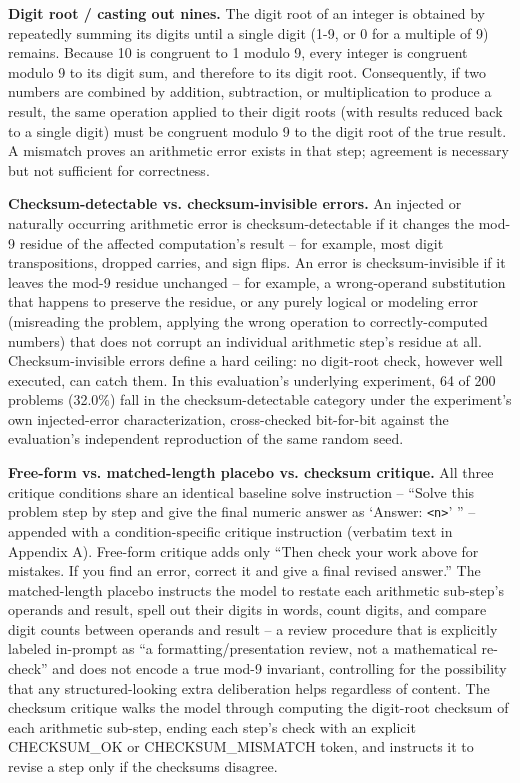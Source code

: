 \documentclass[11pt,letterpaper]{article}
\begin{document}
\textbf{Digit root / casting out nines.} The digit root of an integer is obtained by repeatedly summing its digits until a single digit (1-9, or 0 for a multiple of 9) remains. Because 10 is congruent to 1 modulo 9, every integer is congruent modulo 9 to its digit sum, and therefore to its digit root. Consequently, if two numbers are combined by addition, subtraction, or multiplication to produce a result, the same operation applied to their digit roots (with results reduced back to a single digit) must be congruent modulo 9 to the digit root of the true result. A mismatch proves an arithmetic error exists in that step; agreement is necessary but not sufficient for correctness.

\textbf{Checksum-detectable vs. checksum-invisible errors.} An injected or naturally occurring arithmetic error is checksum-detectable if it changes the mod-9 residue of the affected computation's result -- for example, most digit transpositions, dropped carries, and sign flips. An error is checksum-invisible if it leaves the mod-9 residue unchanged -- for example, a wrong-operand substitution that happens to preserve the residue, or any purely logical or modeling error (misreading the problem, applying the wrong operation to correctly-computed numbers) that does not corrupt an individual arithmetic step's residue at all. Checksum-invisible errors define a hard ceiling: no digit-root check, however well executed, can catch them. In this evaluation's underlying experiment, 64 of 200 problems (32.0\%) fall in the checksum-detectable category under the experiment's own injected-error characterization, cross-checked bit-for-bit against the evaluation's independent reproduction of the same random seed.

\textbf{Free-form vs. matched-length placebo vs. checksum critique.} All three critique conditions share an identical baseline solve instruction -- ``Solve this problem step by step and give the final numeric answer as `Answer: \texttt{<n>}' '' -- appended with a condition-specific critique instruction (verbatim text in Appendix A). Free-form critique adds only ``Then check your work above for mistakes. If you find an error, correct it and give a final revised answer.'' The matched-length placebo instructs the model to restate each arithmetic sub-step's operands and result, spell out their digits in words, count digits, and compare digit counts between operands and result -- a review procedure that is explicitly labeled in-prompt as ``a formatting/presentation review, not a mathematical re-check'' and does not encode a true mod-9 invariant, controlling for the possibility that any structured-looking extra deliberation helps regardless of content. The checksum critique walks the model through computing the digit-root checksum of each arithmetic sub-step, ending each step's check with an explicit CHECKSUM\_OK or CHECKSUM\_MISMATCH token, and instructs it to revise a step only if the checksums disagree.
\end{document}
